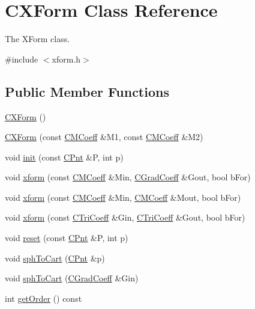 \hypertarget{classCXForm}{\section{C\-X\-Form Class Reference}
\label{classCXForm}
}


The X\-Form class.  




{\ttfamily \#include $<$xform.\-h$>$}

\subsection*{Public Member Functions}
\begin{DoxyCompactItemize}
\item 
\hyperlink{classCXForm_a3079705401c30fcd28c9b6adc9fff542}{C\-X\-Form} ()
\item 
\hyperlink{classCXForm_ad2927e3f30011071f480639691c4a7fa}{C\-X\-Form} (const \hyperlink{classCMCoeff}{C\-M\-Coeff} \&M1, const \hyperlink{classCMCoeff}{C\-M\-Coeff} \&M2)
\item 
void \hyperlink{classCXForm_a9fe5afbc751e5d8a8d48aa20471c84a5}{init} (const \hyperlink{classCPnt}{C\-Pnt} \&P, int p)
\item 
void \hyperlink{classCXForm_aa86ee5b2fefaf70e9f914966555aa6ef}{xform} (const \hyperlink{classCMCoeff}{C\-M\-Coeff} \&Min, \hyperlink{classCGradCoeff}{C\-Grad\-Coeff} \&Gout, bool b\-For)
\item 
void \hyperlink{classCXForm_a1680a3a028017a27dea361e6af92f1fb}{xform} (const \hyperlink{classCMCoeff}{C\-M\-Coeff} \&Min, \hyperlink{classCMCoeff}{C\-M\-Coeff} \&Mout, bool b\-For)
\item 
void \hyperlink{classCXForm_a7c8028608cadb13dfa6320be661256d6}{xform} (const \hyperlink{classCTriCoeff}{C\-Tri\-Coeff} \&Gin, \hyperlink{classCTriCoeff}{C\-Tri\-Coeff} \&Gout, bool b\-For)
\item 
void \hyperlink{classCXForm_a4e9f8fd4d9fd24150cd357f724fa10c1}{reset} (const \hyperlink{classCPnt}{C\-Pnt} \&P, int p)
\item 
void \hyperlink{classCXForm_a092244b7fc2a15139d8aefac7600c549}{sph\-To\-Cart} (\hyperlink{classCPnt}{C\-Pnt} \&p)
\item 
void \hyperlink{classCXForm_abfae99a00642489f3431c8114112a608}{sph\-To\-Cart} (\hyperlink{classCGradCoeff}{C\-Grad\-Coeff} \&Gin)
\item 
int \hyperlink{classCXForm_afb77c0beb4e49769b0eadb717b2d1179}{get\-Order} () const 

\end{DoxyCompactItemize}
